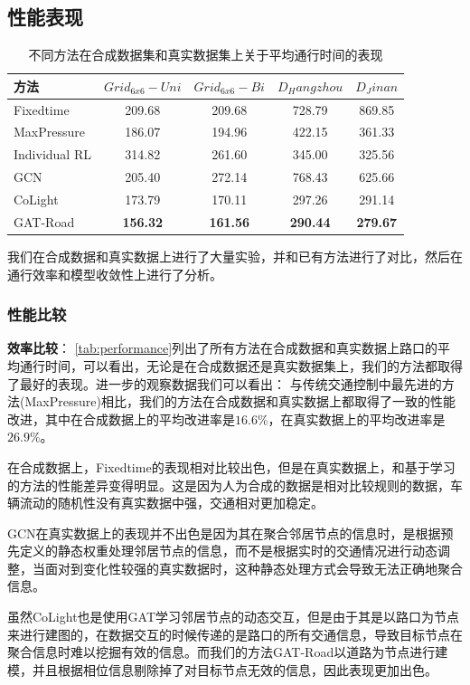\subsection{性能表现}

\begin{table}[htb]
  \caption{不同方法在合成数据集和真实数据集上关于平均通行时间的表现}
  \label{tab:performance}
  \begin{tabular}{lcccc}
  \toprule
  方法 & $Grid_{6x6}-Uni$ & $Grid_{6x6}-Bi$ & $D_Hangzhou$ & $D_Jinan$ \\
  \hline
  Fixedtime & 209.68 & 209.68 & 728.79 & 869.85 \\
  MaxPressure & 186.07 & 194.96 &  422.15 & 361.33 \\
  \hline
  Individual RL & 314.82 & 261.60 & 345.00 & 325.56 \\
  GCN & 205.40 & 272.14 & 768.43 & 625.66 \\
  CoLight & 173.79 & 170.11 & 297.26 & 291.14 \\
  \hline
  GAT-Road & \textbf{156.32} & \textbf{161.56} & \textbf{290.44} & \textbf{279.67} \\
  \bottomrule
  \end{tabular}
\end{table}
我们在合成数据和真实数据上进行了大量实验，并和已有方法进行了对比，然后在通行效率和模型收敛性上进行了分析。

\subsubsection{性能比较}

\textbf{效率比较}：
\autoref{tab:performance}列出了所有方法在合成数据和真实数据上路口的平均通行时间，可以看出，无论是在合成数据还是真实数据集上，我们的方法都取得了最好的表现。进一步的观察数据我们可以看出：
与传统交通控制中最先进的方法(MaxPressure)相比，我们的方法在合成数据和真实数据上都取得了一致的性能改进，其中在合成数据上的平均改进率是$16.6\%$，在真实数据上的平均改进率是$26.9\%$。

在合成数据上，Fixedtime的表现相对比较出色，但是在真实数据上，和基于学习的方法的性能差异变得明显。这是因为人为合成的数据是相对比较规则的数据，车辆流动的随机性没有真实数据中强，交通相对更加稳定。

GCN在真实数据上的表现并不出色是因为其在聚合邻居节点的信息时，是根据预先定义的静态权重处理邻居节点的信息，而不是根据实时的交通情况进行动态调整，当面对到变化性较强的真实数据时，这种静态处理方式会导致无法正确地聚合信息。

虽然CoLight也是使用GAT学习邻居节点的动态交互，但是由于其是以路口为节点来进行建图的，在数据交互的时候传递的是路口的所有交通信息，导致目标节点在聚合信息时难以挖掘有效的信息。而我们的方法GAT-Road以道路为节点进行建模，并且根据相位信息剔除掉了对目标节点无效的信息，因此表现更加出色。

